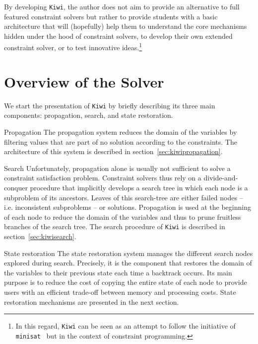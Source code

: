 \documentclass{llncs}
\begin{document}
By developing \texttt{Kiwi}, the author does not aim to provide an alternative to full featured constraint solvers 
but rather to provide students with a basic architecture that will (hopefully) help them to understand the core mechanisms hidden under the hood of constraint solvers, to develop their own extended constraint solver, or to test innovative ideas.\footnote{In this regard, \texttt{Kiwi} can be seen as an attempt to follow the initiative of \texttt{minisat}~\cite{minisat} but in the context of constraint programming.}

\section{Overview of the Solver}

We start the presentation of \texttt{Kiwi} by briefly describing its three main components: propagation, search, and state restoration.

\begin{paragraph}{Propagation}
The propagation system reduces the domain of the variables by filtering values that are part of no solution according to the constraints.
The architecture of this system is described in section~\ref{sec:kiwipropagation}. 
\end{paragraph}

\begin{paragraph}{Search} 
Unfortunately, propagation alone is usually not sufficient to solve a constraint satisfaction problem. 
Constraint solvers thus rely on a divide-and-conquer procedure that implicitly develops a search tree in which each node is a subproblem of its ancestors.
Leaves of this search-tree are either failed nodes -- i.e. inconsistent subproblems -- or solutions.
Propagation is used at the beginning of each node to reduce the domain of the variables and thus to prune fruitless branches of the search tree. 
The search procedure of \texttt{Kiwi} is described in section~\ref{sec:kiwisearch}.
\end{paragraph}

\begin{paragraph}{State restoration} 
The state restoration system manages the different search nodes explored during search. 
Precisely, it is the component that restores the domain of the variables to their previous state each time a backtrack occurs. 
Its main purpose is to reduce the cost of copying the entire state of each node to provide users with an efficient trade-off between memory and processing costs. 
State restoration mechanisms are presented in the next section.
\\
\end{paragraph}
\end{document}
